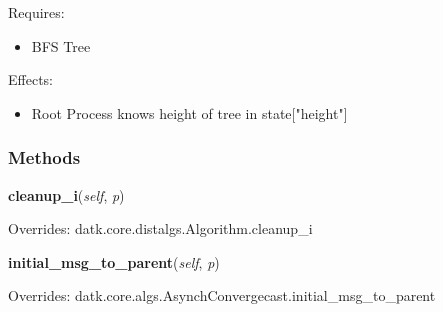 Requires:

\begin{itemize}
\setlength{\parskip}{0.6ex}
  \item BFS Tree

\end{itemize}

Effects:

\begin{itemize}
\setlength{\parskip}{0.6ex}
  \item Root Process knows height of tree in state["height"]

\end{itemize}



  \subsubsection{Methods}

    \vspace{0.5ex}

\hspace{.8\funcindent}\begin{boxedminipage}{\funcwidth}

    \raggedright \textbf{cleanup\_i}(\textit{self}, \textit{p})

\setlength{\parskip}{2ex}
\setlength{\parskip}{1ex}
      Overrides: datk.core.distalgs.Algorithm.cleanup\_i

    \end{boxedminipage}

    \vspace{0.5ex}

\hspace{.8\funcindent}\begin{boxedminipage}{\funcwidth}

    \raggedright \textbf{initial\_msg\_to\_parent}(\textit{self}, \textit{p})

\setlength{\parskip}{2ex}
\setlength{\parskip}{1ex}
      Overrides: datk.core.algs.AsynchConvergecast.initial\_msg\_to\_parent

    \end{boxedminipage}

    \label{datk:core:algs:AsynchConvergeHeight:output_root}

